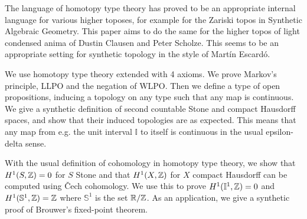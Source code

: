 The language of homotopy type theory has proved to be an appropriate internal language for various higher toposes, 
for example for the Zariski topos in Synthetic Algebraic Geometry. This paper aims to do the same for the higher topos of light condensed anima of Dustin Clausen and Peter Scholze. This seems to be an appropriate setting for synthetic topology in the style of Martín Escardó.

We use homotopy type theory extended with 4 axioms. We prove Markov's principle, LLPO and the negation of WLPO. Then we define a type of open propositions, inducing a topology on any type such that any map is continuous. We give a synthetic definition of second countable Stone and compact Hausdorff spaces, and show that their induced topologies are as expected. This means that any map from e.g. the unit interval $\mathbb{I}$ to itself is continuous in the usual epsilon-delta sense.

With the usual definition of cohomology in homotopy type theory, we show that $H^1(S,\mathbb{Z})=0$ for $S$ Stone and that $H^1(X,\mathbb{Z})$ for $X$ compact Hausdorff can be computed using \v{C}ech cohomology. We use this to prove $H^1(\mathbb{I}^1,\mathbb{Z}) = 0$ and $H^1(\mathbb{S}^1,\mathbb{Z}) = \mathbb{Z}$ where $\mathbb{S}^1$ is the set $\mathbb{R}/\mathbb{Z}$. As an application, we give a synthetic proof of Brouwer's fixed-point theorem.
